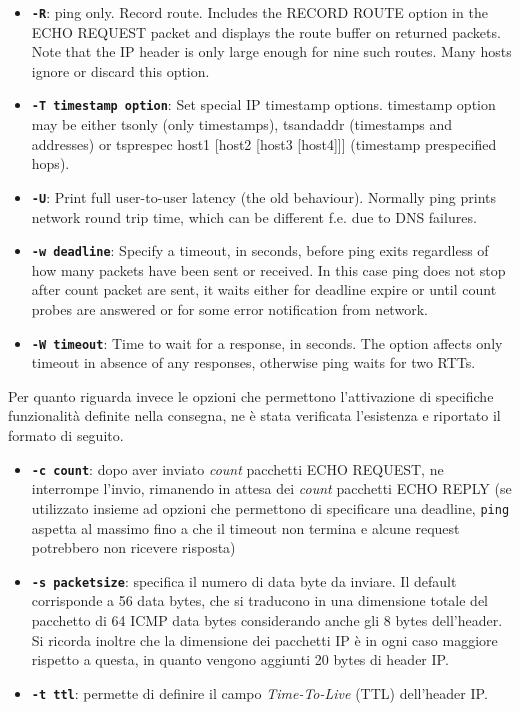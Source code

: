 \documentclass[a4paper,10pt]{article}
\begin{document}
\begin{itemize}
\item \textbf{\texttt{-R}}: ping only. Record route. Includes the RECORD ROUTE option in the ECHO REQUEST packet and displays the route buffer on returned packets. Note that the IP header is only large enough for nine such routes. Many hosts ignore or discard this option.

\item \textbf{\texttt{-T timestamp option}}: Set special IP timestamp options.  timestamp option may be either tsonly (only timestamps), tsandaddr (timestamps and addresses) or tsprespec host1 [host2 [host3 [host4]]] (timestamp prespecified hops).

\item \textbf{\texttt{-U}}:  Print full user-to-user latency (the old behaviour). Normally ping prints network round trip time, which can be different f.e. due to DNS failures.

\item \textbf{\texttt{-w deadline}}: Specify a timeout, in seconds, before ping exits regardless of how many packets have been sent or received. In this case ping does not stop after count packet are sent, it waits either for deadline expire or until count probes are answered or for some error notification from network.

\item \textbf{\texttt{-W timeout}}: Time to wait for a response, in seconds. The option affects only timeout in absence of any responses, otherwise ping waits for two RTTs.
\end{itemize}
Per quanto riguarda invece le opzioni che permettono l'attivazione di specifiche funzionalità definite nella consegna, ne è stata verificata l'esistenza e riportato il formato di seguito.
\begin{itemize}

\item \textbf{\texttt{-c count}}: dopo aver inviato \textit{count} pacchetti ECHO REQUEST, ne interrompe l'invio, rimanendo in attesa dei \textit{count} pacchetti ECHO REPLY (se utilizzato insieme ad opzioni che permettono di specificare una deadline, \texttt{ping} aspetta al massimo fino a che il timeout non termina e alcune request potrebbero non ricevere risposta) 

\item \textbf{\texttt{-s packetsize}}: specifica il numero di data byte da inviare. Il default corrisponde a 56 data bytes, che si traducono in una dimensione totale del pacchetto di 64 ICMP data bytes considerando anche gli 8 bytes dell'header. Si ricorda inoltre che la dimensione dei pacchetti IP è in ogni caso maggiore rispetto a questa, in quanto vengono aggiunti 20 bytes di header IP.

\item \textbf{\texttt{-t ttl}}: permette di definire il campo \textit{Time-To-Live} (TTL) dell'header IP. 

\end{itemize}
\end{document}
